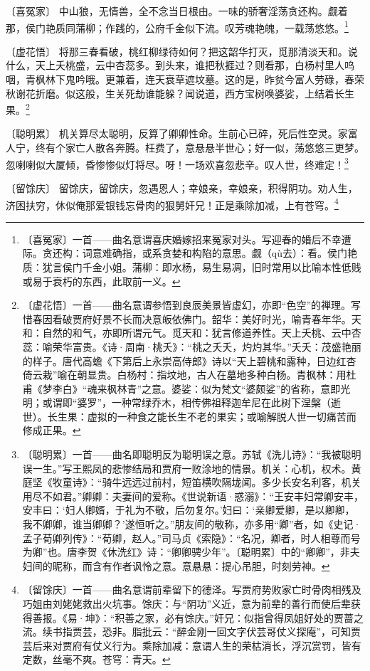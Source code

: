 {    \par 〔喜冤家〕 中山狼，无情兽，全不念当日根由。一味的骄奢淫荡贪还构。觑着那，侯门艳质同蒲柳；作践的，公府千金似下流。叹芳魂艳魄，一载荡悠悠。\footnote{〔喜冤家〕一首——曲名意谓喜庆婚嫁招来冤家对头。写迎春的婚后不幸遭际。贪还构：词意难确指，或系贪婪和构陷的意思。觑（qù去）：看。侯门艳质：犹言侯门千金小姐。蒲柳：即水杨，易生易凋，旧时常用以比喻本性低贱或易于衰朽的东西，此取前一义。}
    \par 〔虚花悟〕 将那三春看破，桃红柳绿待如何？把这韶华打灭，觅那清淡天和。说什么，天上夭桃盛，云中杏蕊多。到头来，谁把秋捱过？则看那，白杨村里人呜咽，青枫林下鬼吟哦。更兼着，连天衰草遮坟墓。这的是，昨贫今富人劳碌，春荣秋谢花折磨。似这般，生关死劫谁能躲？闻说道，西方宝树唤婆娑，上结着长生果。\footnote{〔虚花悟〕一首——曲名意谓参悟到良辰美景皆虚幻，亦即“色空”的禅理。写惜春因看破贾府好景不长而决意皈依佛门。韶华：美好时光，喻青春年华。天和：自然的和气，亦即所谓元气。觅天和：犹言修道养性。天上夭桃、云中杏蕊：喻荣华富贵。《诗·周南·桃夭》：“桃之夭夭，灼灼其华。”夭夭：茂盛艳丽的样子。唐代高蟾《下第后上永崇高侍郎》诗以“天上碧桃和露种，日边红杏倚云栽”喻在朝显贵。白杨村：指坟地，古人在墓地多种白杨。青枫林：用杜甫《梦李白》“魂来枫林青”之意。婆娑：似为梵文“婆颇娑”的省称，意即光明；或谓即“婆罗”，一种常绿乔木，相传佛祖释迦牟尼在此树下涅槃（逝世）。长生果：虚拟的一种食之能长生不老的果实；或喻解脱人世一切痛苦而修成正果。}
    \par 〔聪明累〕 机关算尽太聪明，反算了卿卿性命。生前心已碎，死后性空灵。家富人宁，终有个家亡人散各奔腾。枉费了，意悬悬半世心；好一似，荡悠悠三更梦。忽喇喇似大厦倾，昏惨惨似灯将尽。呀！一场欢喜忽悲辛。叹人世，终难定！\footnote{〔聪明累〕一首——曲名即聪明反为聪明误之意。苏轼《洗儿诗》：“我被聪明误一生。”写王熙凤的悲惨结局和贾府一败涂地的情景。机关：心机，权术。黄庭坚《牧童诗》：“骑牛远远过前村，短笛横吹隔垅闻。多少长安名利客，机关用尽不如君。”卿卿：夫妻间的爱称。《世说新语·惑溺》：“王安丰妇常卿安丰，安丰曰：‘妇人卿婿，于礼为不敬，后勿复尔。’妇曰：‘亲卿爱卿，是以卿卿，我不卿卿，谁当卿卿？’遂恒听之。”朋友间的敬称，亦多用“卿”者，如《史记·孟子荀卿列传》：“荀卿，赵人。”司马贞《索隐》：“名况，卿者，时人相尊而号为卿”也。唐李贺《休洗红》诗：“卿卿骋少年”。〔聪明累〕中的“卿卿”，非夫妇间的昵称，而含有作者讽怜之意。意悬悬：提心吊胆，时刻劳神。}
    \par 〔留馀庆〕 留馀庆，留馀庆，忽遇恩人；幸娘亲，幸娘亲，积得阴功。劝人生，济困扶穷，休似俺那爱银钱忘骨肉的狠舅奸兄！正是乘除加减，上有苍穹。\footnote{〔留馀庆〕一首——曲名意谓前辈留下的德泽。写贾府势败家亡时骨肉相残及巧姐由刘姥姥救出火坑事。馀庆：与“阴功”义近，意为前辈的善行而使后辈获得善报。《易·坤》：“积善之家，必有馀庆。”奸兄：似指曾得凤姐好处的贾蔷之流。续书指贾芸，恐非。脂批云：“醉金刚一回文字伏芸哥仗义探庵”，可知贾芸后来对贾府有仗义行为。乘除加减：意谓人生的荣枯消长，浮沉赏罚，皆有定数，丝毫不爽。苍穹：青天。}
}
